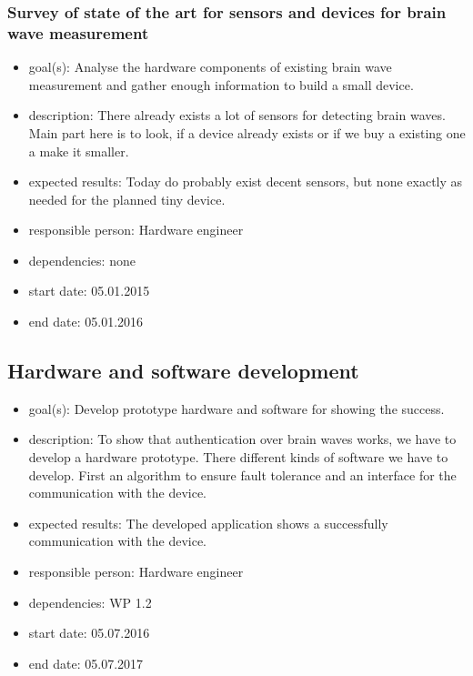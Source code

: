 \subsubsection{Survey of state of the art for sensors and devices for brain wave measurement}
\begin{itemize}
 \item goal(s): Analyse the hardware components of existing brain wave measurement and gather enough information to build a small device.
 \item description: There already exists a lot of sensors for detecting brain waves. Main part here is to look, if a device already exists or if we buy a existing one a make it smaller.
 \item expected results: Today do probably exist decent sensors, but none exactly as needed for the planned tiny device.
 \item responsible person: Hardware engineer
 \item dependencies: none
 \item start date: 05.01.2015
 \item end date: 05.01.2016
\end{itemize}

\subsection{Hardware and software development}
\begin{itemize}
 \item goal(s): Develop prototype hardware and software for showing the success.
 \item description: To show that authentication over brain waves works, we have to develop a hardware prototype. There different kinds of software we have to develop. First an algorithm to ensure fault tolerance and an interface for the communication with the device.
 \item expected results: The developed application shows a successfully communication with the device.
 \item responsible person: Hardware engineer
 \item dependencies: WP 1.2
 \item start date: 05.07.2016
 \item end date: 05.07.2017
\end{itemize}

